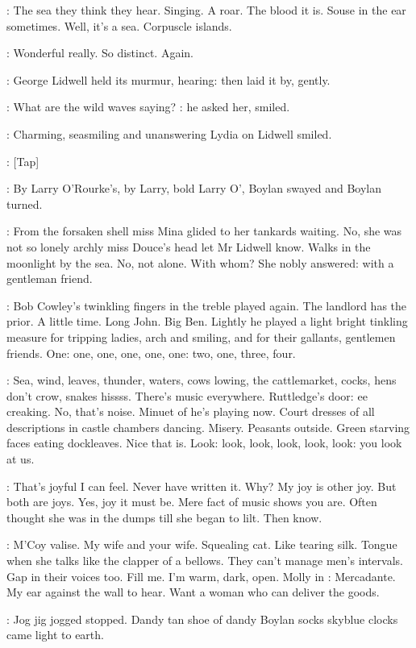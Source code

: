\BloomInt:
The sea they think they hear.
Singing.
A roar.
The blood it is.
Souse
in the ear sometimes.
Well,
it's a sea.
Corpuscle islands.

\lidwell:
Wonderful really.
So distinct.
Again.

:
George Lidwell held its murmur,
hearing:
then laid it by,
gently.

\lidwell:
What are the wild waves saying?
:
he asked her,
smiled.

:
Charming,
seasmiling and unanswering
Lydia on Lidwell smiled.

\stripling:
[Tap]

:
By Larry O'Rourke's,
by Larry,
bold Larry O',
Boylan swayed and
Boylan turned.

:
From the forsaken shell miss Mina glided to her tankards waiting.
No,
she was not so lonely archly miss Douce's head let Mr Lidwell know.
Walks in the moonlight by the sea.
No,
not alone.
With whom?
She nobly
answered:
with a gentleman friend.

:
Bob Cowley's twinkling fingers in the treble played again.
The
landlord has the prior.
A little time.
Long John.
Big Ben.
Lightly he
played a light bright tinkling measure for tripping ladies,
arch and
smiling,
and for their gallants,
gentlemen friends.
One:
one,
one,
one,
one,
one:
two,
one,
three,
four.

\BloomInt:
Sea,
wind,
leaves,
thunder,
waters,
cows lowing,
the cattlemarket,
cocks,
hens don't crow,
snakes hissss.
There's music everywhere.
Ruttledge's door:
ee creaking.
No,
that's noise.
Minuet of
he's playing now.
Court dresses of all descriptions in castle chambers
dancing.
Misery.
Peasants outside.
Green starving faces eating
dockleaves.
Nice that is.
Look:
look,
look,
look,
look,
look:
you
look at us.

\BloomInt:
That's joyful I can feel.
Never have written it.
Why?
My joy is other
joy.
But both are joys.
Yes,
joy it must be.
Mere fact of music shows you
are.
Often thought she was in the dumps till she began to lilt.
Then
know.

\BloomInt:
M'Coy valise.
My wife and your wife.
Squealing cat.
Like tearing silk.
Tongue when she talks like the clapper of a bellows.
They can't manage
men's intervals.
Gap in their voices too.
Fill me.
I'm warm,
dark,
open.
Molly in :
Mercadante.
My ear against the wall to hear.
Want
a woman who can deliver the goods.

\BloomInt:
Jog jig jogged stopped.
Dandy tan shoe of dandy Boylan socks
skyblue clocks came light to earth.

